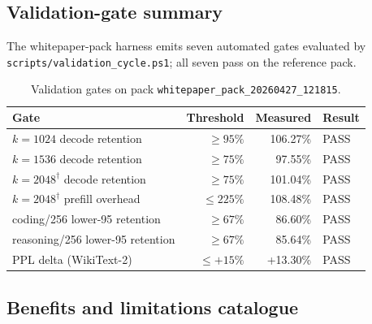 \documentclass[11pt]{article}
\begin{document}
\subsection{Validation-gate summary}

The whitepaper-pack harness emits seven automated gates evaluated by
\texttt{scripts/validation\_cycle.ps1}; all seven pass on the reference pack.

\begin{table}[h]\centering\footnotesize
\caption{Validation gates on pack \texttt{whitepaper\_pack\_20260427\_121815}.}
\begin{tabular}{@{}lrrl@{}}
\toprule
\textbf{Gate} & \textbf{Threshold} & \textbf{Measured} & \textbf{Result}\\
\midrule
$k{=}1024$ decode retention             & $\geq 95\%$ & 106.27\% & PASS\\
$k{=}1536$ decode retention             & $\geq 75\%$ &  97.55\% & PASS\\
$k{=}2048^\dagger$ decode retention     & $\geq 75\%$ & 101.04\% & PASS\\
$k{=}2048^\dagger$ prefill overhead     & $\leq 225\%$& 108.48\% & PASS\\
coding/256 lower-95 retention           & $\geq 67\%$ &  86.60\% & PASS\\
reasoning/256 lower-95 retention        & $\geq 67\%$ &  85.64\% & PASS\\
PPL delta (WikiText-2)                  & $\leq +15\%$&  +13.30\% & PASS\\
\bottomrule
\end{tabular}
\end{table}

\subsection{Benefits and limitations catalogue}
\end{document}
